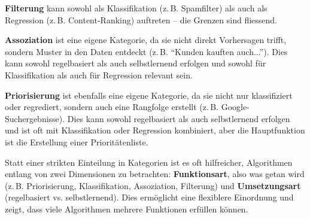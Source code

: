 \textbf{Filterung} kann sowohl als Klassifikation (z.\,B. Spamfilter) als auch als Regression (z.\,B. Content-Ranking) auftreten -- die Grenzen sind fliessend.

\textbf{Assoziation} ist eine eigene Kategorie, da sie nicht direkt Vorhersagen trifft, sondern Muster in den Daten entdeckt (z.\,B. \enquote{Kunden kauften auch...}). Dies kann sowohl regelbasiert als auch selbstlernend erfolgen und sowohl für Klassifikation als auch für Regression relevant sein.

\textbf{Priorisierung} ist ebenfalls eine eigene Kategorie, da sie nicht nur klassifiziert oder regrediert, sondern auch eine Rangfolge erstellt (z.\,B. Google-Suchergebnisse). Dies kann sowohl regelbasiert als auch selbstlernend erfolgen und ist oft mit Klassifikation oder Regression kombiniert, aber die Hauptfunktion ist die Erstellung einer Prioritätenliste.

Statt einer strikten Einteilung in Kategorien ist es oft hilfreicher, Algorithmen entlang von zwei Dimensionen zu betrachten: \textbf{Funktionsart}, also was getan wird (z.\,B. Priorisierung, Klassifikation, Assoziation, Filterung) und \textbf{Umsetzungsart} (regelbasiert vs. selbstlernend). Dies ermöglicht eine flexiblere Einordnung und zeigt, dass viele Algorithmen mehrere Funktionen erfüllen können.

